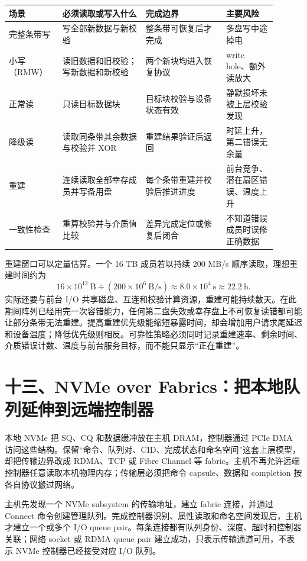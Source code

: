 \begin{longtable}{L{0.18\linewidth}L{0.28\linewidth}L{0.27\linewidth}L{0.17\linewidth}}
\toprule
场景 & 必须读取或写入什么 & 完成边界 & 主要风险 \\
\midrule
完整条带写 & 写全部新数据与新校验 & 整条带可恢复后才完成 & 多盘写中途掉电 \\\tablerowrule
小写（RMW） & 读旧数据和旧校验；写新数据和新校验 & 两个新块均进入恢复协议 & write hole、额外读放大 \\\tablerowrule
正常读 & 只读目标数据块 & 目标块校验与设备状态有效 & 静默损坏未被上层校验发现 \\\tablerowrule
降级读 & 读取同条带其余数据与校验并 XOR & 重建结果验证后返回 & 时延上升，第二错误无余量 \\\tablerowrule
重建 & 连续读取全部幸存成员并写备用盘 & 每个条带重建并校验后推进进度 & 前台竞争、潜在扇区错误、温度上升 \\\tablerowrule
一致性检查 & 重算校验并与介质值比较 & 差异完成定位或修复后闭合 & 不知道错误成员时误修正确数据 \\
\bottomrule
\end{longtable}

重建窗口可以定量估算。一个 16 TB 成员若以持续 200 MB/s 顺序读取，理想重建时间约为
\[
16\times10^{12}\ \mathrm{B}\div(200\times10^{6}\ \mathrm{B/s})
\approx 8.0\times10^4\ \mathrm{s}\approx22.2\ \mathrm{h}.
\]
实际还要与前台 I/O 共享磁盘、互连和校验计算资源，重建可能持续数天。在此期间阵列已经用完一次容错能力，任何第二盘失效或幸存盘上不可恢复读错都可能让部分条带无法重建。提高重建优先级能缩短暴露时间，却会增加用户请求尾延迟和设备温度；降低优先级则相反。可靠性策略必须同时记录重建速率、剩余时间、介质错误计数、温度与前台服务目标，而不能只显示“正在重建”。
\section{十三、NVMe over Fabrics：把本地队列延伸到远端控制器}

本地 NVMe 把 SQ、CQ 和数据缓冲放在主机 DRAM，控制器通过 PCIe DMA 访问这些结构。保留“命令、队列对、CID、完成状态和命名空间”这套上层模型，却把传输边界改成 RDMA、TCP 或 Fibre Channel 等 fabric。主机不再允许远端控制器任意读取本机物理内存；传输层必须把命令 capsule、数据和 completion 按各自协议搬过网络。\cite{nvme-of}


主机先发现一个 NVMe subsystem 的传输地址，建立 fabric 连接，并通过 Connect 命令创建管理队列。完成控制器识别、属性读取和命名空间发现后，主机才建立一个或多个 I/O queue pair。每条连接都有队列身份、深度、超时和控制器关联；网络 socket 或 RDMA queue pair 建立成功，只表示传输通道可用，不表示 NVMe 控制器已经接受对应 I/O 队列。

